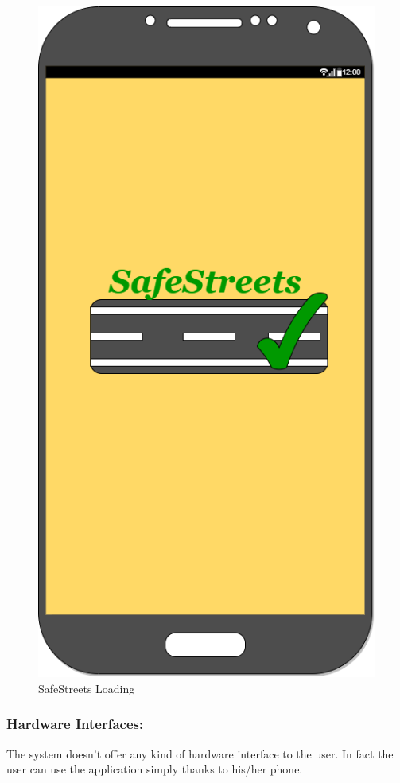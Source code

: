 \documentclass[titlepage]{article}
\begin{document}
\begin{itemize}
\begin{itemize}
	\begin{figure}[h]
	\includegraphics[scale=0.3]{Mockups/Introduction.png}
	\centering
	\caption{SafeStreets Loading}
	\end{figure}
	\FloatBarrier

		
		
	\end{itemize}
	
\subsubsection{Hardware Interfaces: }
The system doesn't offer any kind of hardware interface to the user. In fact the user can use the application simply thanks to his/her phone.

\end{itemize}
\end{document}
